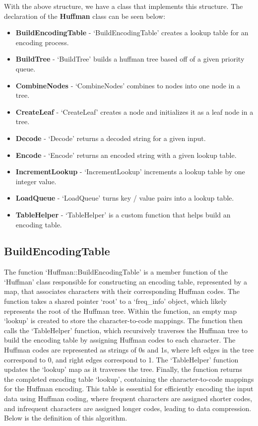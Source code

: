 \noindent With the above structure, we have a class that implements this structure. The declaration of the \textbf{Huffman} class can be seen below:

\begin{itemize}
    \item \textbf{BuildEncodingTable} - `BuildEncodingTable' creates a lookup table for an encoding process.
    \item \textbf{BuildTree} - `BuildTree' builds a huffman tree based off of a given priority queue.
    \item \textbf{CombineNodes} - `CombineNodes' combines to nodes into one node in a tree.
    \item \textbf{CreateLeaf} - `CreateLeaf' creates a node and initializes it as a leaf node in a tree.
    \item \textbf{Decode} - `Decode' returns a decoded string for a given input.
    \item \textbf{Encode} - `Encode' returns an encoded string with a given lookup table.
    \item \textbf{IncrementLookup} - `IncrementLookup' increments a lookup table by one integer value.
    \item \textbf{LoadQueue} - `LoadQueue' turns key / value pairs into a lookup table.
    \item \textbf{TableHelper} - `TableHelper' is a custom function that helps build an encoding table.
\end{itemize}

\subsection*{BuildEncodingTable}

The function `Huffman::BuildEncodingTable' is a member function of the `Huffman' class responsible for constructing an encoding table, represented by a map, that associates characters with their 
corresponding Huffman codes. The function takes a shared pointer `root' to a `freq\_info' object, which likely represents the root of the Huffman tree. Within the function, an empty map `lookup' 
is created to store the character-to-code mappings. The function then calls the `TableHelper' function, which recursively traverses the Huffman tree to build the encoding table by assigning 
Huffman codes to each character. The Huffman codes are represented as strings of 0s and 1s, where left edges in the tree correspond to 0, and right edges correspond to 1. The `TableHelper' 
function updates the `lookup' map as it traverses the tree. Finally, the function returns the completed encoding table `lookup', containing the character-to-code mappings for the Huffman encoding. 
This table is essential for efficiently encoding the input data using Huffman coding, where frequent characters are assigned shorter codes, and infrequent characters are assigned longer codes, 
leading to data compression. Below is the definition of this algorithm.

